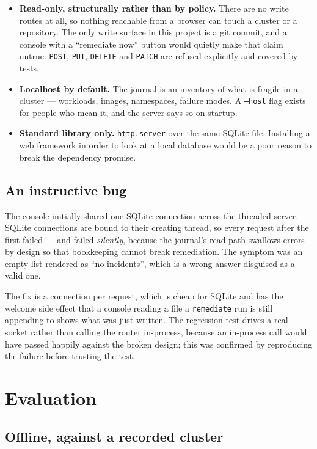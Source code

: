 \documentclass[11pt,a4paper]{article}
\newcommand{\code}[1]{\texttt{\small #1}}
\begin{document}
\begin{itemize}
  \item \textbf{Read-only, structurally rather than by policy.} There are no write routes at all, so nothing reachable from a browser can touch a cluster or a repository. The only write surface in this project is a git commit, and a console with a ``remediate now'' button would quietly make that claim untrue. \code{POST}, \code{PUT}, \code{DELETE} and \code{PATCH} are refused explicitly and covered by tests.
  \item \textbf{Localhost by default.} The journal is an inventory of what is fragile in a cluster --- workloads, images, namespaces, failure modes. A \code{--host} flag exists for people who mean it, and the server says so on startup.
  \item \textbf{Standard library only.} \code{http.server} over the same SQLite file. Installing a web framework in order to look at a local database would be a poor reason to break the dependency promise.
\end{itemize}

\subsection{An instructive bug}

The console initially shared one SQLite connection across the threaded server.
SQLite connections are bound to their creating thread, so every request after the
first failed --- and failed \emph{silently}, because the journal's read path
swallows errors by design so that bookkeeping cannot break remediation. The
symptom was an empty list rendered as ``no incidents'', which is a wrong answer
disguised as a valid one.

The fix is a connection per request, which is cheap for SQLite and has the
welcome side effect that a console reading a file a \code{remediate} run is still
appending to shows what was just written. The regression test drives a real
socket rather than calling the router in-process, because an in-process call
would have passed happily against the broken design; this was confirmed by
reproducing the failure before trusting the test.

\section{Evaluation}

\subsection{Offline, against a recorded cluster}
\end{document}

